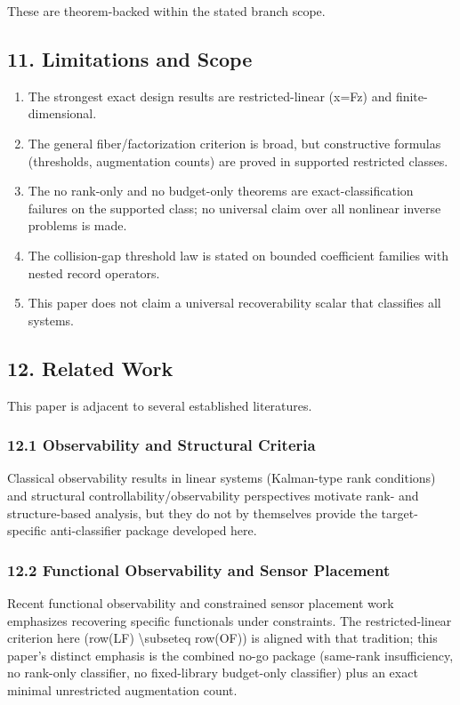 \documentclass[11pt]{article}
\begin{document}
These are theorem-backed within the stated branch scope.


\subsection*{11. Limitations and Scope}
\begin{enumerate}
\item The strongest exact design results are restricted-linear (x=Fz) and finite-dimensional.
\item The general fiber/factorization criterion is broad, but constructive formulas (thresholds, augmentation counts) are proved in supported restricted classes.
\item The no rank-only and no budget-only theorems are exact-classification failures on the supported class; no universal claim over all nonlinear inverse problems is made.
\item The collision-gap threshold law is stated on bounded coefficient families with nested record operators.
\item This paper does not claim a universal recoverability scalar that classifies all systems.
\end{enumerate}

\subsection*{12. Related Work}
This paper is adjacent to several established literatures.


\subsubsection*{12.1 Observability and Structural Criteria}
Classical observability results in linear systems (Kalman-type rank conditions) and structural controllability/observability perspectives motivate rank- and structure-based analysis, but they do not by themselves provide the target-specific anti-classifier package developed here.


\subsubsection*{12.2 Functional Observability and Sensor Placement}
Recent functional observability and constrained sensor placement work emphasizes recovering specific functionals under constraints. The restricted-linear criterion here (row(LF) \textbackslash{}subseteq row(OF)) is aligned with that tradition; this paper's distinct emphasis is the combined no-go package (same-rank insufficiency, no rank-only classifier, no fixed-library budget-only classifier) plus an exact minimal unrestricted augmentation count.
\end{document}
